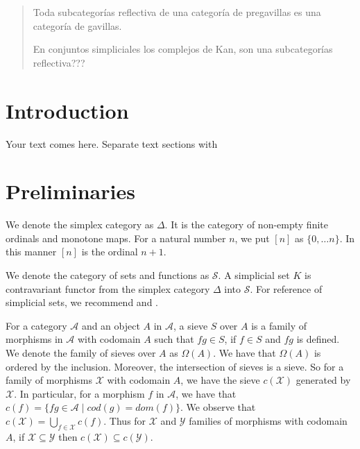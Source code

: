 \date{Received: date / Accepted: date}


\maketitle

\begin{abstract}
Toda subcategorías reflectiva de una categoría de pregavillas es una categoría de gavillas.

En conjuntos simpliciales los complejos de Kan, son una subcategorías reflectiva???
\end{abstract}

\section{Introduction}
\label{intro}
Your text comes here. Separate text sections with


\section{Preliminaries}
\label{sec:1}

We denote the simplex category as $\Delta$. It is the category of non-empty finite ordinals and monotone maps. For a natural number $n$, we put $[n]$ as $\{0,\dots n\}$. In this manner $[n]$ is the ordinal $n+1$.

We denote the category of sets and functions as $\mathcal{S}$. A simplicial set $K$ is contravariant functor from the simplex category $\Delta$ into $\mathcal{S}$. For reference of simplicial sets, we recommend \cite{SHT} and \cite{SOAT}.

For a category $\mathcal{A}$ and an object $A$ in $\mathcal{A}$, a sieve $S$ over $A$ is a family of morphisms in $\mathcal{A}$ with codomain $A$ such that $fg\in S$, if $f\in S$ and $fg$ is defined. We denote the family of sieves over $A$ as $\Omega(A)$. We have that $\Omega(A)$ is ordered by the inclusion. Moreover, the intersection of sieves is a sieve. So for a family of morphisms $\mathcal{X}$ with codomain $A$, we have the sieve $c(\mathcal{X})$ generated by $\mathcal{X}$. In particular, for a morphism $f$ in $\mathcal{A}$, we have that $c(f)=\{fg\in\mathcal{A}\mid cod(g)=dom(f)\}$. We observe that $c(\mathcal{X})=\bigcup_{f\in\mathcal{X}}c(f)$. Thus for  $\mathcal{X}$ and $\mathcal{Y}$ families of morphisms with codomain $A$, if $\mathcal{X}\subseteq \mathcal{Y}$ then $c(\mathcal{X})\subseteq c(\mathcal{Y})$.

